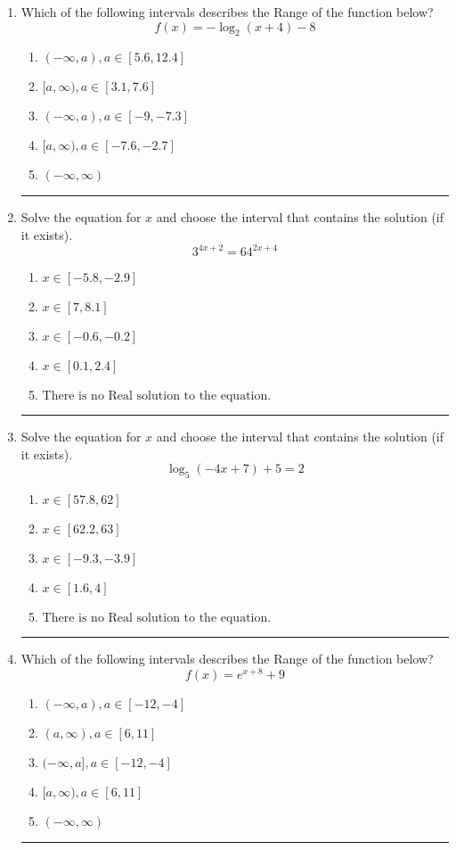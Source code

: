 \documentclass[14pt]{extbook}
\newcommand{\litem}[1]{\item#1\hspace*{-1cm}\rule{\textwidth}{0.4pt}}
\begin{document}
\begin{enumerate}
\litem{
Which of the following intervals describes the Range of the function below?\[ f(x) = -\log_2{(x+4)}-8 \]\begin{enumerate}[label=\Alph*.]
\item \( (-\infty, a), a \in [5.6, 12.4] \)
\item \( [a, \infty), a \in [3.1, 7.6] \)
\item \( (-\infty, a), a \in [-9, -7.3] \)
\item \( [a, \infty), a \in [-7.6, -2.7] \)
\item \( (-\infty, \infty) \)

\end{enumerate} }
\litem{
Solve the equation for $x$ and choose the interval that contains the solution (if it exists).\[ 3^{4x+2} = 64^{2x+4} \]\begin{enumerate}[label=\Alph*.]
\item \( x \in [-5.8, -2.9] \)
\item \( x \in [7, 8.1] \)
\item \( x \in [-0.6, -0.2] \)
\item \( x \in [0.1, 2.4] \)
\item \( \text{There is no Real solution to the equation.} \)

\end{enumerate} }
\litem{
Solve the equation for $x$ and choose the interval that contains the solution (if it exists).\[ \log_{5}{(-4x+7)}+5 = 2 \]\begin{enumerate}[label=\Alph*.]
\item \( x \in [57.8, 62] \)
\item \( x \in [62.2, 63] \)
\item \( x \in [-9.3, -3.9] \)
\item \( x \in [1.6, 4] \)
\item \( \text{There is no Real solution to the equation.} \)

\end{enumerate} }
\litem{
Which of the following intervals describes the Range of the function below?\[ f(x) = e^{x+8}+9 \]\begin{enumerate}[label=\Alph*.]
\item \( (-\infty, a), a \in [-12, -4] \)
\item \( (a, \infty), a \in [6, 11] \)
\item \( (-\infty, a], a \in [-12, -4] \)
\item \( [a, \infty), a \in [6, 11] \)
\item \( (-\infty, \infty) \)


\end{enumerate}}
\end{enumerate}
\end{document}
